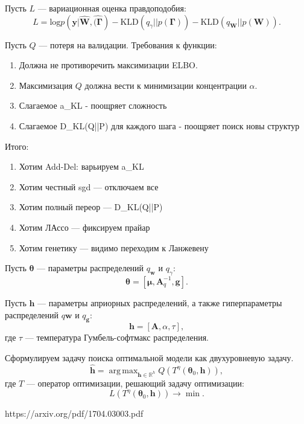 \documentclass[12pt]{article}
\DeclareMathOperator*{\argmax}{arg\,max}
\begin{document}
Пусть $L$ --- вариационная оценка правдоподобия:
\[
    L = \text{log} p(\mathbf{y}|\hat{\mathbf{W}}, \hat{(\boldsymbol{\Gamma}}) - \text{KLD}(q_\gamma||p(\boldsymbol{\Gamma})) - \text{KLD}(q_\mathbf{W}||p(\mathbf{W})).
\]

Пусть $Q$ --- потеря на валидации. Требования к функции:
\begin{enumerate}
\item Должна не противоречить максимизации ELBO.
\item Максимизация $Q$ должна вести к минимизации концентрации $\alpha$.
\item Слагаемое a_KL - поощряет сложность
\item Слагаемое D_KL(Q||P) для каждого шага - поощряет поиск новы структур
\end{enumerate}

Итого:
\begin{enumerate}
\item Хотим Add-Del: варьируем a_KL
\item Хотим честный sgd --- отключаем все
\item Хотим полный переор --- D_KL(Q||P)
\item Хотим ЛАссо --- фиксируем прайар
\item Хотим генетику --- видимо переходим к Ланжевену
\end{enumerate}

Пусть $\boldsymbol{\theta}$ --- параметры распределений $q_\mathbf{w}$ и $q_\gamma$:
\[
    \boldsymbol{\theta} = [\boldsymbol{\mu}, \mathbf{A}_q^{-1}, \mathbf{g}].
\] 

Пусть $\mathbf{h}$ --- параметры априорных распределений, а также гиперпараметры распределений  $q\mathbf{w}$ и $q_\mathbf{g}$:
\[
    \mathbf{h} = [\mathbf{A}, \alpha, \tau],
\]
где $\tau$ --- температура Гумбель-софтмакс распределения.



Сформулируем задачу поиска оптимальной модели как двухуровневую задачу.
\begin{equation}
\label{eq:optim}
	\hat{\mathbf{h}} = \argmax_{\mathbf{h} \in \mathbb{R}^h} Q( T^\eta(\boldsymbol{\theta}_0, \mathbf{h})),
\end{equation}
где $T$ --- оператор оптимизации, решающий задачу оптимизации:
\[
    L(T^\eta(\boldsymbol{\theta}_0, \mathbf{h})) \to \min.
\]

https://arxiv.org/pdf/1704.03003.pdf
\end{document}
